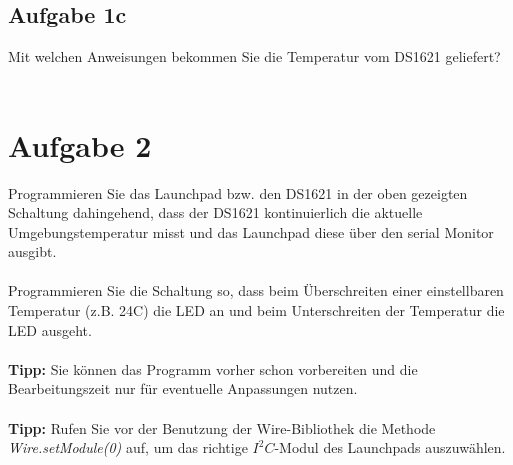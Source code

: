 \subsection{Aufgabe 1c}
Mit welchen Anweisungen bekommen Sie die Temperatur vom DS1621 geliefert?\\ \\

\section{Aufgabe 2}
Programmieren Sie das Launchpad bzw. den DS1621 in der oben gezeigten Schaltung dahingehend, dass der DS1621 kontinuierlich die aktuelle Umgebungstemperatur misst und das Launchpad diese über den serial Monitor ausgibt.\\ \\
Programmieren Sie die Schaltung so, dass beim Überschreiten einer einstellbaren Temperatur (z.B. 24\textdegree{}C) die LED an und beim Unterschreiten der Temperatur die LED ausgeht.\\ \\
\textbf{Tipp:} Sie können das Programm vorher schon vorbereiten und die Bearbeitungszeit nur für eventuelle Anpassungen nutzen.\\ \\
\textbf{Tipp:} Rufen Sie vor der Benutzung der Wire-Bibliothek die Methode\\
\textit{Wire.setModule(0)} auf, um das richtige $I^2C$-Modul des Launchpads auszuwählen.\\ \\
